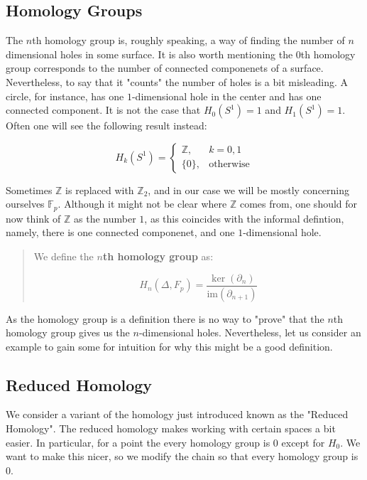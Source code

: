\documentclass[letterpaper,12pt]{article}
\begin{document}
\begin{quote}
\end{quote}

\subsection{Homology Groups}

The $n$th homology group is, roughly speaking, a way of finding the number of $n$ dimensional holes in some surface. It is also worth mentioning the $0$th homology group corresponds to the number of connected componenets of a surface. Nevertheless, to say that it "counts" the number of holes is a bit misleading. A circle, for instance, has one $1$-dimensional hole in the center and has one connected component. It is not the case that $H_0(S^1) = 1$ and $H_1(S^1) = 1$. Often one will see the following result instead:

$$H_k(S^1) =
\begin{cases}
    \mathbb{Z}, & k = 0, 1 \\
    \{ 0 \}, & \text{otherwise}
\end{cases}
$$

Sometimes $\mathbb{Z}$ is replaced with $\mathbb{Z}_2$, and in our case we will be mostly concerning ourselves $\mathbb{F}_p$. Although it might not be clear where $\mathbb{Z}$ comes from, one should for now think of $\mathbb{Z}$ as the number $1$, as this coincides with the informal defintion, namely, there is one connected componenet, and one $1$-dimensional hole.

\begin{quote}
    We define the $n$\textbf{th homology group} as:

    $$H_n(\Delta, F_p) = \frac{\ker(\partial_n)}{\text{im}(\partial_{n+1})}$$
\end{quote}

As the homology group is a definition there is no way to "prove" that the $n$th homology group gives us the $n$-dimensional holes. Nevertheless, let us consider an example to gain some for intuition for why this might be a good definition.

\subsection{Reduced Homology}

We consider a variant of the homology just introduced known as the "Reduced Homology". The reduced homology makes working with certain spaces a bit easier. In particular, for a point the every homology group is $0$ except for $H_0$. We want to make this nicer, so we modify the chain so that every homology group is $0$.
\end{document}

